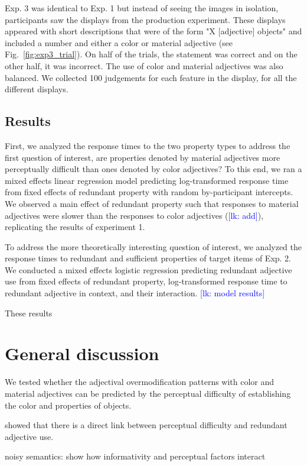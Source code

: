 \documentclass[12pt,letterpaper]{article}
\newcommand{\lk}[1]{\textcolor{Blue}{[lk: #1]}}
\begin{document}
Exp. 3 was identical to Exp. 1 but instead of seeing the images in isolation, participants saw the displays from the production experiment. These displays appeared with short descriptions that were of the form "X [adjective] objects" and included a number and either a color or material adjective (see Fig.~\ref{fig:exp3_trial}). On half of the trials, the statement was correct and on the other half, it was incorrect. The use of color and material adjectives was also balanced. We collected 100 judgements for each feature in the display, for all the different displays.

\subsection{Results} 

First, we analyzed the response times to the two property types to address the first question of interest, are properties denoted by material adjectives more perceptually difficult than ones denoted by color adjectives? To this end, we ran a mixed effects linear regression model predicting log-transformed response time from fixed effects of redundant property with random by-participant intercepts. We observed a main effect of redundant property such that responses to material adjectives were slower than the responses to color adjectives (\lk{add}), replicating the results of experiment 1. 

To address the more theoretically interesting question of interest, we analyzed the response times to redundant and sufficient properties of target items of Exp. 2. We conducted a mixed effects logistic regression predicting redundant adjective use from fixed effects of redundant property, log-transformed response time to redundant adjective in context, and their interaction. \lk{model results}

These results 

\section{General discussion} 

We tested whether the adjectival overmodification patterns with color and material adjectives can be predicted by the perceptual difficulty of establishing the color and properties of objects. 

showed that there is a direct link between perceptual difficulty and redundant adjective use.

noisy semantics: show how informativity and perceptual factors interact
\end{document}
